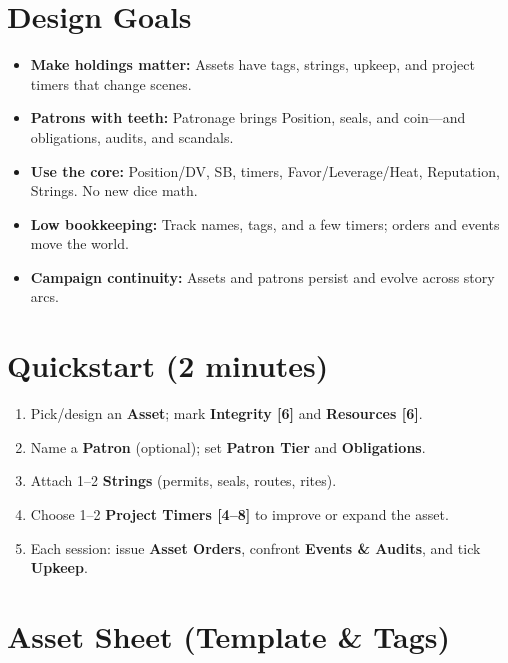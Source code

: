 \documentclass[10pt]{article}
\begin{document}
    \section*{Design Goals}
    \begin{itemize}
      \item \textbf{Make holdings matter:} Assets have tags, strings, upkeep, and project timers that change scenes.
      \item \textbf{Patrons with teeth:} Patronage brings Position, seals, and coin---and obligations, audits, and scandals.
      \item \textbf{Use the core:} Position/DV, SB, timers, Favor/Leverage/Heat, Reputation, Strings. No new dice math.
      \item \textbf{Low bookkeeping:} Track names, tags, and a few timers; orders and events move the world.
      \item \textbf{Campaign continuity:} Assets and patrons persist and evolve across story arcs.
    \end{itemize}
    
    \section*{Quickstart (2 minutes)}
    \begin{enumerate}
      \item Pick/design an \textbf{Asset}; mark \textbf{Integrity [6]} and \textbf{Resources [6]}.
      \item Name a \textbf{Patron} (optional); set \textbf{Patron Tier} and \textbf{Obligations}.
      \item Attach 1--2 \textbf{Strings} (permits, seals, routes, rites).
      \item Choose 1--2 \textbf{Project Timers [4--8]} to improve or expand the asset.
      \item Each session: issue \textbf{Asset Orders}, confront \textbf{Events \& Audits}, and tick \textbf{Upkeep}.
    \end{enumerate}
    
    \tableofcontents
    \newpage
    
    \section{Asset Sheet (Template \& Tags)}
\end{document}

